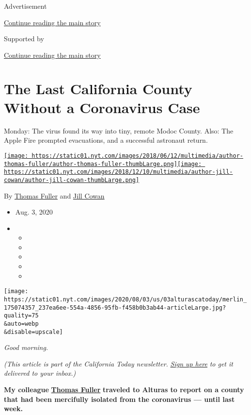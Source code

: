Advertisement

\protect\hyperlink{after-top}{Continue reading the main story}

Supported by

\protect\hyperlink{after-sponsor}{Continue reading the main story}

\hypertarget{the-last-california-county-without-a-coronavirus-case}{%
\section{The Last California County Without a Coronavirus
Case}\label{the-last-california-county-without-a-coronavirus-case}}

Monday: The virus found its way into tiny, remote Modoc County. Also:
The Apple Fire prompted evacuations, and a successful astronaut return.

\href{https://www.nytimes.com/by/thomas-fuller}{\texttt{[image: https://static01.nyt.com/images/2018/06/12/multimedia/author-thomas-fuller/author-thomas-fuller-thumbLarge.png]}}\href{https://www.nytimes.com/by/jill-cowan}{\texttt{[image: https://static01.nyt.com/images/2018/12/10/multimedia/author-jill-cowan/author-jill-cowan-thumbLarge.png]}}

By \href{https://www.nytimes.com/by/thomas-fuller}{Thomas Fuller} and
\href{https://www.nytimes.com/by/jill-cowan}{Jill Cowan}

\begin{itemize}
\item
  Aug. 3, 2020
\item
  \begin{itemize}
  \item
  \item
  \item
  \item
  \item
  \end{itemize}
\end{itemize}

\texttt{[image: https://static01.nyt.com/images/2020/08/03/us/03alturascatoday/merlin\_175074357\_237ea6ee-554a-4856-95fb-f458b0b3ab44-articleLarge.jpg?quality=75\\\&auto=webp\\\&disable=upscale]}

\emph{Good morning.}

\emph{(This article is part of the California Today newsletter.}
\href{https://www.nytimes.com/newsletters/california-today}{\emph{Sign
up here}} \emph{to get it delivered to your inbox.)}

\textbf{My colleague}
\textbf{\href{https://www.nytimes.com/by/thomas-fuller}{Thomas Fuller}}
\textbf{traveled to Alturas to report on a county that had been
mercifully isolated from the coronavirus --- until last week.}

